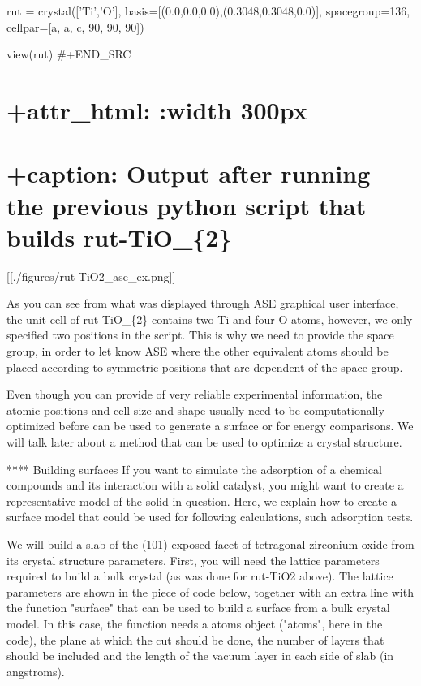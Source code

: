 \documentclass[11pt]{article}
\begin{document}
rut = crystal({[}'Ti','O'{]},
basis={[}(0.0,0.0,0.0),(0.3048,0.3048,0.0){]}, spacegroup=136,
cellpar={[}a, a, c, 90, 90, 90{]})

view(rut) \#+END\_SRC

\section{+attr\_html: :width 300px}\label{attr_html-width-300px}

\section{+caption: Output after running the previous python script that
builds
rut-TiO\_\{2\}}\label{caption-output-after-running-the-previous-python-script-that-builds-rut-tio_2}

{[}{[}./figures/rut-TiO2\_ase\_ex.png{]}{]}

As you can see from what was displayed through ASE graphical user
interface, the unit cell of rut-TiO\_\{2\} contains two Ti and four O
atoms, however, we only specified two positions in the script. This is
why we need to provide the space group, in order to let know ASE where
the other equivalent atoms should be placed according to symmetric
positions that are dependent of the space group.

Even though you can provide of very reliable experimental information,
the atomic positions and cell size and shape usually need to be
computationally optimized before can be used to generate a surface or
for energy comparisons. We will talk later about a method that can be
used to optimize a crystal structure.

**** Building surfaces If you want to simulate the adsorption of a
chemical compounds and its interaction with a solid catalyst, you might
want to create a representative model of the solid in question. Here, we
explain how to create a surface model that could be used for following
calculations, such adsorption tests.

We will build a slab of the (101) exposed facet of tetragonal zirconium
oxide from its crystal structure parameters. First, you will need the
lattice parameters required to build a bulk crystal (as was done for
rut-TiO2 above). The lattice parameters are shown in the piece of code
below, together with an extra line with the function "surface" that can
be used to build a surface from a bulk crystal model. In this case, the
function needs a atoms object ("atoms", here in the code), the plane at
which the cut should be done, the number of layers that should be
included and the length of the vacuum layer in each side of slab (in
angstroms).
\end{document}
